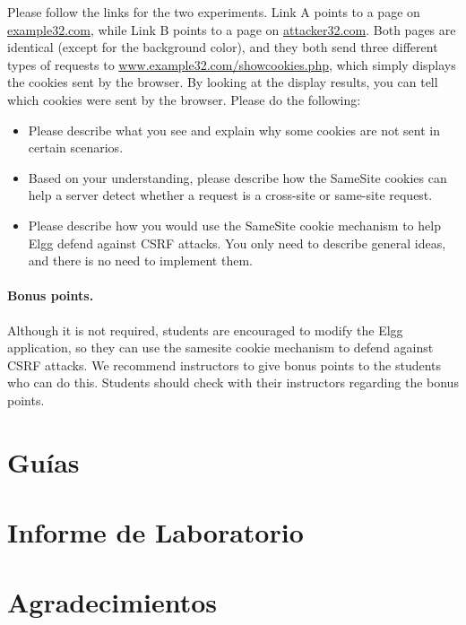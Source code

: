 Please follow the links for the two experiments. Link A points to a page 
on \url{example32.com}, while Link B points to a page 
on \url{attacker32.com}. Both pages are identical (except for the background
color), and they both send three different types of requests to
\url{www.example32.com/showcookies.php}, which
simply displays the cookies sent by the browser. By looking 
at the display results, you can tell which cookies were sent 
by the browser. Please do the following: 


\begin{itemize}
\item Please describe what you see and explain why some cookies are 
not sent in certain scenarios. 
 
\item Based on your understanding, please describe how the SameSite
cookies can help a server detect whether a request 
is a cross-site or same-site request. 

\item Please describe how you would use
the SameSite cookie mechanism to help Elgg defend against CSRF attacks. 
You only need to describe general ideas, and there is no need to 
implement them. 
\end{itemize}


\paragraph{Bonus points.} Although it is not required, students
are encouraged to modify the Elgg application, so they
can use the samesite cookie mechanism to defend against
CSRF attacks. We recommend instructors to give bonus points 
to the students who can do this. Students should check with 
their instructors regarding the bonus points.


\section{Guías}





\section{Informe de Laboratorio}




\section*{Agradecimientos}








